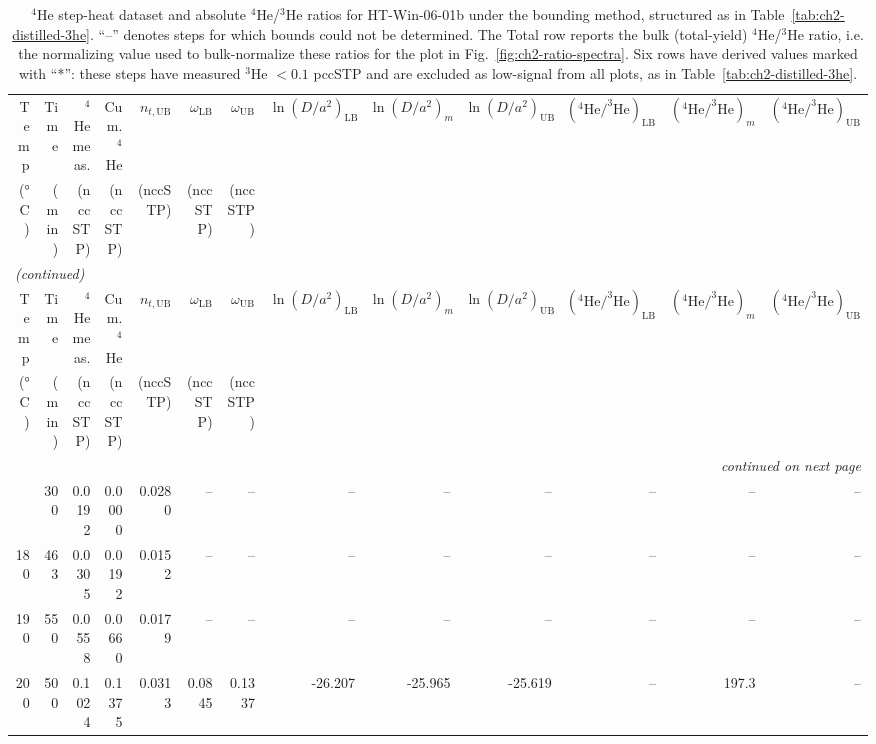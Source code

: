\begin{landscape}
\begin{footnotesize}
\begin{longtable}{r r r r r r r r r r r r r}
\caption{$^4$He step-heat dataset and absolute $^4$He/$^3$He ratios for HT-Win-06-01b under the bounding method, structured as in Table~\ref{tab:ch2-distilled-3he}. ``--'' denotes steps for which bounds could not be determined. The Total row reports the bulk (total-yield) $^4$He/$^3$He ratio, i.e. the normalizing value used to bulk-normalize these ratios for the plot in Fig.~\ref{fig:ch2-ratio-spectra}. Six rows have derived values marked with ``*'': these steps have measured $^3$He $<0.1$ pccSTP and are excluded as low-signal from all plots, as in Table~\ref{tab:ch2-distilled-3he}.}\label{tab:ch2-distilled-4he}\\
\toprule
Temp & Time & $^4$He meas. & Cum. $^4$He & $n_{t,\mathrm{UB}}$ & $\omega_{\mathrm{LB}}$ & $\omega_{\mathrm{UB}}$ & $\ln(D/a^2)_{\mathrm{LB}}$ & $\ln(D/a^2)_{m}$ & $\ln(D/a^2)_{\mathrm{UB}}$ & $(^4\mathrm{He}/^3\mathrm{He})_{\mathrm{LB}}$ & $(^4\mathrm{He}/^3\mathrm{He})_{m}$ & $(^4\mathrm{He}/^3\mathrm{He})_{\mathrm{UB}}$ \\
(°C) & (min) & (nccSTP) & (nccSTP) & (nccSTP) & (nccSTP) & (nccSTP) &  &  &  &  &  &  \\
\midrule
\endfirsthead
\multicolumn{13}{l}{\textit{(continued)}} \\
\toprule
Temp & Time & $^4$He meas. & Cum. $^4$He & $n_{t,\mathrm{UB}}$ & $\omega_{\mathrm{LB}}$ & $\omega_{\mathrm{UB}}$ & $\ln(D/a^2)_{\mathrm{LB}}$ & $\ln(D/a^2)_{m}$ & $\ln(D/a^2)_{\mathrm{UB}}$ & $(^4\mathrm{He}/^3\mathrm{He})_{\mathrm{LB}}$ & $(^4\mathrm{He}/^3\mathrm{He})_{m}$ & $(^4\mathrm{He}/^3\mathrm{He})_{\mathrm{UB}}$ \\
(°C) & (min) & (nccSTP) & (nccSTP) & (nccSTP) & (nccSTP) & (nccSTP) &  &  &  &  &  &  \\
\midrule
\endhead
\midrule
\multicolumn{13}{r}{\textit{continued on next page}} \\
\endfoot
\bottomrule
\endlastfoot
170 & 300 & 0.0192 & 0.0000 & 0.0280 & -- & -- & -- & -- & -- & -- & -- & -- \\
180 & 463 & 0.0305 & 0.0192 & 0.0152 & -- & -- & -- & -- & -- & -- & -- & -- \\
190 & 550 & 0.0558 & 0.0660 & 0.0179 & -- & -- & -- & -- & -- & -- & -- & -- \\
200 & 500 & 0.1024 & 0.1375 & 0.0313 & 0.0845 & 0.1337 & -26.207 & -25.965 & -25.619 & -- & 197.3 & -- \\

\end{longtable}
\end{footnotesize}
\end{landscape}

